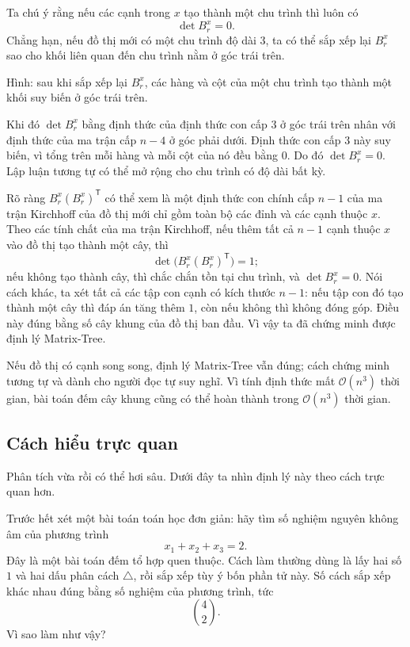 \documentclass[11pt]{article}
\newcommand{\Oh}{\mathcal{O}}
\begin{document}
Ta chú ý rằng nếu các cạnh trong \(x\) tạo thành một chu trình thì luôn có
\[
  \det B_r^x=0.
\]
Chẳng hạn, nếu đồ thị mới có một chu trình độ dài \(3\), ta có thể sắp xếp lại
\(B_r^x\) sao cho khối liên quan đến chu trình nằm ở góc trái trên.

\begin{center}
  \small Hình: sau khi sắp xếp lại \(B_r^x\), các hàng và cột của một chu trình
  tạo thành một khối suy biến ở góc trái trên.
\end{center}

Khi đó \(\det B_r^x\) bằng định thức của định thức con cấp \(3\) ở góc trái
trên nhân với định thức của ma trận cấp \(n-4\) ở góc phải dưới. Định thức con
cấp \(3\) này suy biến, vì tổng trên mỗi hàng và mỗi cột của nó đều bằng
\(0\). Do đó \(\det B_r^x=0\). Lập luận tương tự có thể mở rộng cho chu trình
có độ dài bất kỳ.

Rõ ràng \(B_r^x(B_r^x)^{\mathsf T}\) có thể xem là một định thức con chính cấp
\(n-1\) của ma trận Kirchhoff của đồ thị mới chỉ gồm toàn bộ các đỉnh và các
cạnh thuộc \(x\). Theo các tính chất của ma trận Kirchhoff, nếu thêm tất cả
\(n-1\) cạnh thuộc \(x\) vào đồ thị tạo thành một cây, thì
\[
  \det\!\bigl(B_r^x(B_r^x)^{\mathsf T}\bigr)=1;
\]
nếu không tạo thành cây, thì chắc chắn tồn tại chu trình, và
\(\det B_r^x=0\). Nói cách khác, ta xét tất cả các tập con cạnh có kích thước
\(n-1\): nếu tập con đó tạo thành một cây thì đáp án tăng thêm \(1\), còn nếu
không thì không đóng góp. Điều này đúng bằng số cây khung của đồ thị ban đầu.
Vì vậy ta đã chứng minh được định lý Matrix-Tree.

Nếu đồ thị có cạnh song song, định lý Matrix-Tree vẫn đúng; cách chứng minh
tương tự và dành cho người đọc tự suy nghĩ. Vì tính định thức mất
\(\Oh(n^3)\) thời gian, bài toán đếm cây khung cũng có thể hoàn thành trong
\(\Oh(n^3)\) thời gian.

\subsection{Cách hiểu trực quan}

Phân tích vừa rồi có thể hơi sâu. Dưới đây ta nhìn định lý này theo cách trực
quan hơn.

Trước hết xét một bài toán toán học đơn giản: hãy tìm số nghiệm nguyên không
âm của phương trình
\[
  x_1+x_2+x_3=2.
\]
Đây là một bài toán đếm tổ hợp quen thuộc. Cách làm thường dùng là lấy hai số
\(1\) và hai dấu phân cách \(\triangle\), rồi sắp xếp tùy ý bốn phần tử này.
Số cách sắp xếp khác nhau đúng bằng số nghiệm của phương trình, tức
\[
  \binom{4}{2}.
\]
Vì sao làm như vậy?
\end{document}
